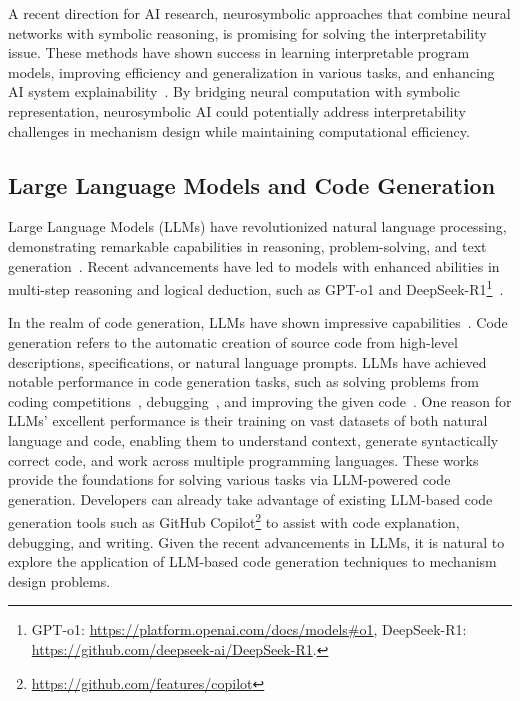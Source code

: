 A recent direction for AI research, neurosymbolic approaches that combine neural networks with symbolic reasoning, is promising for solving the interpretability issue. These methods have shown success in learning interpretable program models, improving efficiency and generalization in various tasks, and enhancing AI system explainability~\cite{hitzler2022neuro,sarker2022neuro,sheth2023neurosymbolic}. By bridging neural computation with symbolic representation, neurosymbolic AI could potentially address interpretability challenges in mechanism design while maintaining computational efficiency.

\subsection{Large Language Models and Code Generation}
Large Language Models (LLMs) have revolutionized natural language processing, demonstrating remarkable capabilities in reasoning, problem-solving, and text generation~\cite{zhao2023survey}. Recent advancements have led to models with enhanced abilities in multi-step reasoning and logical deduction, such as GPT-o1 and DeepSeek-R1\footnote{GPT-o1: \url{https://platform.openai.com/docs/models\#o1}, DeepSeek-R1: \url{https://github.com/deepseek-ai/DeepSeek-R1}.}~\cite{xiang2025towards,guan2025rstar,liu2024deepseek,mercer2025brief}.

In the realm of code generation, LLMs have shown impressive capabilities~\cite{nijkamp2022codegen,fried2022incoder,chen2021evaluating}.
Code generation refers to the automatic creation of source code from high-level descriptions, specifications, or natural language prompts. LLMs have achieved notable performance in code generation tasks, such as solving problems from coding competitions~\cite{AlphaCode}, debugging~\cite{Program-Repair-Inferfix,chen2023teaching,liventsev2023fully}, and improving the given code~\cite{Code-edits}. One reason for LLMs' excellent performance is their training on vast datasets of both natural language and code, enabling them to understand context, generate syntactically correct code, and work across multiple programming languages.
These works provide the foundations for solving various tasks via LLM-powered code generation. 
Developers can already take advantage of existing LLM-based code generation tools such as GitHub Copilot\footnote{\url{https://github.com/features/copilot}} to assist with code explanation, debugging, and writing. 
Given the recent advancements in LLMs, it is natural to explore the application of LLM-based code generation techniques to mechanism design problems. 


